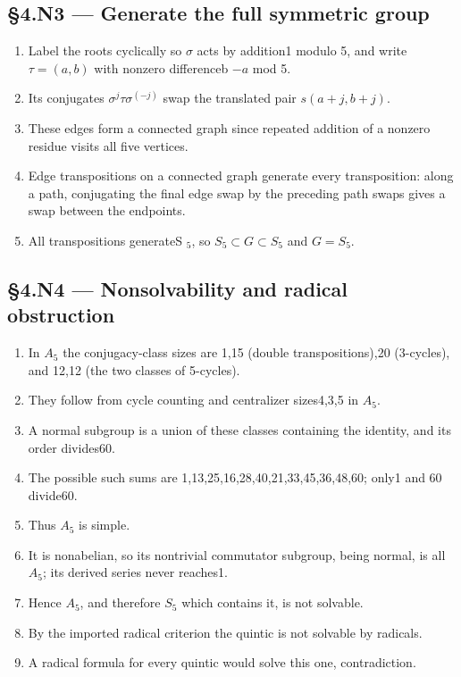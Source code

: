 \documentclass[preprint,12pt,aps,pra,showkeys,amsmath,amssymb,superscriptaddress,floatfix]{revtex4-2}
\theoremstyle{definition}
\theoremstyle{remark}
\begin{document}
\subsection{§4.N3 --- Generate the full symmetric
group}\label{n3-generate-the-full-symmetric-group}

\begin{enumerate}
\def\labelenumi{\arabic{enumi}.}
\item
  Label the roots cyclically so \(\sigma\) acts by addition1 modulo 5,
  and write \(\tau =(a,b)\) with nonzero differenceb \(-a\) mod 5.
\item
  Its conjugates \(\sigma ^j\tau \sigma ^{(-j)}\) swap the translated
  pair \(s(a+j,b+j)\).
\item
  These edges form a connected graph since repeated addition of a
  nonzero residue visits all five vertices.
\item
  Edge transpositions on a connected graph generate every transposition:
  along a path, conjugating the final edge swap by the preceding path
  swaps gives a swap between the endpoints.
\item
  All transpositions generateS \(_{5}\), so
  \(S_{5}\subset G\subset S_{5}\) and \(G=S_{5}\).
\end{enumerate}

\subsection{§4.N4 --- Nonsolvability and radical
obstruction}\label{n4-nonsolvability-and-radical-obstruction}

\begin{enumerate}
\def\labelenumi{\arabic{enumi}.}
\item
  In \(A_{5}\) the conjugacy-class sizes are 1,15 (double
  transpositions),20 (3-cycles), and 12,12 (the two classes of
  5-cycles).
\item
  They follow from cycle counting and centralizer sizes4,3,5 in
  \(A_{5}\).
\item
  A normal subgroup is a union of these classes containing the identity,
  and its order divides60.
\item
  The possible such sums are 1,13,25,16,28,40,21,33,45,36,48,60; only1
  and 60 divide60.
\item
  Thus \(A_{5}\) is simple.
\item
  It is nonabelian, so its nontrivial commutator subgroup, being normal,
  is all \(A_{5}\); its derived series never reaches1.
\item
  Hence \(A_{5}\), and therefore \(S_{5}\) which contains it, is not
  solvable.
\item
  By the imported radical criterion the quintic is not solvable by
  radicals.
\item
  A radical formula for every quintic would solve this one,
  contradiction.
\end{enumerate}
\end{document}
